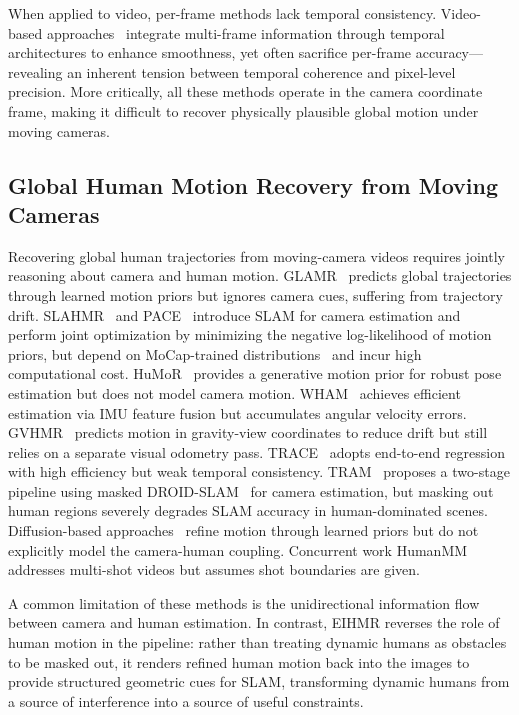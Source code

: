 \documentclass[runningheads]{llncs}
\begin{document}
When applied to video, per-frame methods lack temporal consistency. Video-based approaches~\cite{TCMR2021,MPSNet2022, MotionBERT2023,kanazawa2019learning, luo20203d} integrate multi-frame information through temporal architectures to enhance smoothness, yet often sacrifice per-frame accuracy---revealing an inherent tension between temporal coherence and pixel-level precision. More critically, all these methods operate in the camera coordinate frame, making it difficult to recover physically plausible global motion under moving cameras.

\subsection{Global Human Motion Recovery from Moving Cameras}

Recovering global human trajectories from moving-camera videos requires jointly reasoning about camera and human motion. GLAMR~\cite{GLAMR2022} predicts global trajectories through learned motion priors but ignores camera cues, suffering from trajectory drift. SLAHMR~\cite{SLAHMR2023} and PACE~\cite{PACE2024} introduce SLAM for camera estimation and perform joint optimization by minimizing the negative log-likelihood of motion priors, but depend on MoCap-trained distributions~\cite{AMASS2019} and incur high computational cost. HuMoR~\cite{HuMoR2022} provides a generative motion prior for robust pose estimation but does not model camera motion. WHAM~\cite{WHAM2024} achieves efficient estimation via IMU feature fusion but accumulates angular velocity errors. GVHMR~\cite{GVHMR2024} predicts motion in gravity-view coordinates to reduce drift but still relies on a separate visual odometry pass. TRACE~\cite{TRACE2023} adopts end-to-end regression with high efficiency but weak temporal consistency. TRAM~\cite{TRAM2024} proposes a two-stage pipeline using masked DROID-SLAM~\cite{DROIDSLAM2021} for camera estimation, but masking out human regions severely degrades SLAM accuracy in human-dominated scenes. Diffusion-based approaches~\cite{RoHM2024,PhysDiff2023} refine motion through learned priors but do not explicitly model the camera-human coupling. Concurrent work HumanMM~\cite{HumanMM2025} addresses multi-shot videos but assumes shot boundaries are given.

A common limitation of these methods is the unidirectional information flow between camera and human estimation. In contrast, EIHMR reverses the role of human motion in the pipeline: rather than treating dynamic humans as obstacles to be masked out, it renders refined human motion back into the images to provide structured geometric cues for SLAM, transforming dynamic humans from a source of interference into a source of useful constraints.
\end{document}
